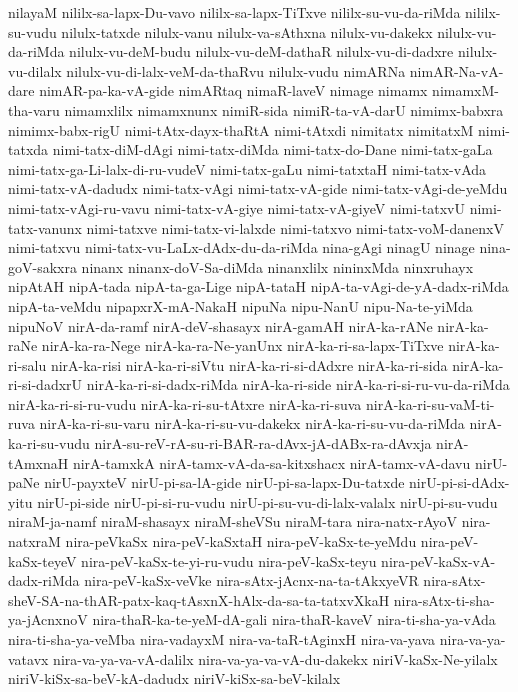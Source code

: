 {nilayaM
nililx-sa-lapx-Du-vavo
nililx-sa-lapx-TiTxve
nililx-su-vu-da-riMda
nililx-su-vudu
nilulx-tatxde
nilulx-vanu
nilulx-va-sAthxna
nilulx-vu-dakekx
nilulx-vu-da-riMda
nilulx-vu-deM-budu
nilulx-vu-deM-dathaR
nilulx-vu-di-dadxre
nilulx-vu-dilalx
nilulx-vu-di-lalx-veM-da-thaRvu
nilulx-vudu
nimARNa
nimAR-Na-vA-dare
nimAR-pa-ka-vA-gide
nimARtaq
nimaR-laveV
nimage
nimamx
nimamxM-tha-varu
nimamxlilx
nimamxnunx
nimiR-sida
nimiR-ta-vA-darU
nimimx-babxra
nimimx-babx-rigU
nimi-tAtx-dayx-thaRtA
nimi-tAtxdi
nimitatx
nimitatxM
nimi-tatxda
nimi-tatx-diM-dAgi
nimi-tatx-diMda
nimi-tatx-do-Dane
nimi-tatx-gaLa
nimi-tatx-ga-Li-lalx-di-ru-vudeV
nimi-tatx-gaLu
nimi-tatxtaH
nimi-tatx-vAda
nimi-tatx-vA-dadudx
nimi-tatx-vAgi
nimi-tatx-vA-gide
nimi-tatx-vAgi-de-yeMdu
nimi-tatx-vAgi-ru-vavu
nimi-tatx-vA-giye
nimi-tatx-vA-giyeV
nimi-tatxvU
nimi-tatx-vanunx
nimi-tatxve
nimi-tatx-vi-lalxde
nimi-tatxvo
nimi-tatx-voM-danenxV
nimi-tatxvu
nimi-tatx-vu-LaLx-dAdx-du-da-riMda
nina-gAgi
ninagU
ninage
nina-goV-sakxra
ninanx
ninanx-doV-Sa-diMda
ninanxlilx
nininxMda
ninxruhayx
nipAtAH
nipA-tada
nipA-ta-ga-Lige
nipA-tataH
nipA-ta-vAgi-de-yA-dadx-riMda
nipA-ta-veMdu
nipapxrX-mA-NakaH
nipuNa
nipu-NanU
nipu-Na-te-yiMda
nipuNoV
nirA-da-ramf
nirA-deV-shasayx
nirA-gamAH
nirA-ka-rANe
nirA-ka-raNe
nirA-ka-ra-Nege
nirA-ka-ra-Ne-yanUnx
nirA-ka-ri-sa-lapx-TiTxve
nirA-ka-ri-salu
nirA-ka-risi
nirA-ka-ri-siVtu
nirA-ka-ri-si-dAdxre
nirA-ka-ri-sida
nirA-ka-ri-si-dadxrU
nirA-ka-ri-si-dadx-riMda
nirA-ka-ri-side
nirA-ka-ri-si-ru-vu-da-riMda
nirA-ka-ri-si-ru-vudu
nirA-ka-ri-su-tAtxre
nirA-ka-ri-suva
nirA-ka-ri-su-vaM-ti-ruva
nirA-ka-ri-su-varu
nirA-ka-ri-su-vu-dakekx
nirA-ka-ri-su-vu-da-riMda
nirA-ka-ri-su-vudu
nirA-su-reV-rA-su-ri-BAR-ra-dAvx-jA-dABx-ra-dAvxja
nirA-tAmxnaH
nirA-tamxkA
nirA-tamx-vA-da-sa-kitxshacx
nirA-tamx-vA-davu
nirU-paNe
nirU-payxteV
nirU-pi-sa-lA-gide
nirU-pi-sa-lapx-Du-tatxde
nirU-pi-si-dAdx-yitu
nirU-pi-side
nirU-pi-si-ru-vudu
nirU-pi-su-vu-di-lalx-valalx
nirU-pi-su-vudu
niraM-ja-namf
niraM-shasayx
niraM-sheVSu
niraM-tara
nira-natx-rAyoV
nira-natxraM
nira-peVkaSx
nira-peV-kaSxtaH
nira-peV-kaSx-te-yeMdu
nira-peV-kaSx-teyeV
nira-peV-kaSx-te-yi-ru-vudu
nira-peV-kaSx-teyu
nira-peV-kaSx-vA-dadx-riMda
nira-peV-kaSx-veVke
nira-sAtx-jAcnx-na-ta-tAkxyeVR
nira-sAtx-sheV-SA-na-thAR-patx-kaq-tAsxnX-hAlx-da-sa-ta-tatxvXkaH
nira-sAtx-ti-sha-ya-jAcnxnoV
nira-thaR-ka-te-yeM-dA-gali
nira-thaR-kaveV
nira-ti-sha-ya-vAda
nira-ti-sha-ya-veMba
nira-vadayxM
nira-va-taR-tAginxH
nira-va-yava
nira-va-ya-vatavx
nira-va-ya-va-vA-dalilx
nira-va-ya-va-vA-du-dakekx
niriV-kaSx-Ne-yilalx
niriV-kiSx-sa-beV-kA-dadudx
niriV-kiSx-sa-beV-kilalx
}
